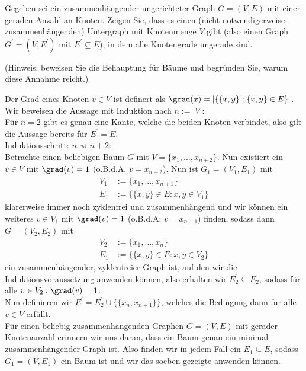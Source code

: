 
\begin{exercise}

Gegeben sei ein zusammenhängender ungerichteter Graph $G = (V,E)$ mit einer geraden Anzahl an Knoten.
Zeigen Sie, dass es einen (nicht notwendigerweise zusammenhängenden) Untergraph mit
Knotenmenge $V$ gibt (also einen Graph $G^\prime = (V, E^\prime)$ mit $E^\prime \subseteq E$),
in dem alle Knotengrade ungerade sind.

(Hinweis: beweisen Sie die Behauptung für Bäume und begründen Sie, warum diese Annahme reicht.)

\end{exercise}


\begin{solution}
Der Grad eines Knoten $v \in V$
ist definert als $\grad(x) = |\{\{x,y\}: \{x,y\} \in E\}|$. \\
Wir beweisen die Aussage mit Induktion nach $n := |V|$: \\
Für $n = 2$ gibt es genau eine Kante, welche die beiden Knoten verbindet,
also gilt die Aussage bereits für $E^{\prime} = E$. \\
Induktionsschritt: $n \rightsquigarrow n + 2$: \\
Betrachte einen beliebigen Baum $G$ mit $V = \{x_1,\dots,x_{n+2}\}$.
Nun existiert ein $v \in V$ mit $\grad(v) = 1$ (o.B.d.A. $v = x_{n+2}$).
Nun ist $G_1 = (V_1,E_1)$ mit
\begin{align*}
  V_1 &:= \{x_1,\dots,x_{n+1}\} \\
  E_1 &:= \{\{x,y\} \in E: x,y \in V_1\}
\end{align*}
klarerweise immer noch zyklenfrei und zusammenhängend und wir können
ein weiteres $v \in V_1$ mit $\grad(v) = 1$ (o.B.d.A: $v = x_{n+1}$) finden, sodass
dann $G = (V_2,E_2)$ mit
\begin{align*}
  V_2 &:= \{x_1,\dots,x_{n}\} \\
    E_1 &:= \{\{x,y\} \in E: x,y \in V_2\}
\end{align*}
ein zusammenhängender, zyklenfreier Graph ist, auf den wir die Induktionsvoraussetzung
anwenden können, also erhalten wir $E_2^{\prime} \subseteq E_2$, sodass
für alle $v \in V_2: \grad(v) = 1$. \\
Nun definieren wir $E^{\prime} = E_2^{\prime} \cup \{\{x_n,x_{n+1}\}\}$, welches
die Bedingung dann für alle $v \in V$ erfüllt. \\


Für einen beliebig zusammenhängenden Graphen $G = (V,E)$ mit gerader Knotenanzahl
erinnern wir uns daran, dass
ein Baum genau ein minimal zusammenhängender Graph ist.
Also finden wir in jedem Fall ein $E_1 \subseteq E$, sodass $G_1 = (V,E_1)$
ein Baum ist und wir das soeben gezeigte anwenden können.
\end{solution}


